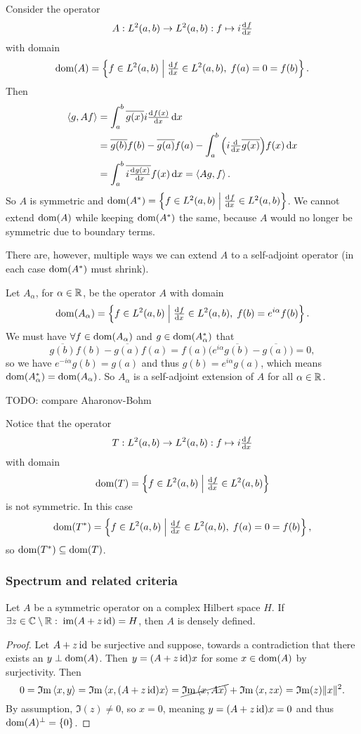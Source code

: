 \begin{example}
Consider the operator
\[ A: L^2(a,b) \to L^2(a,b): f\mapsto i\od{f}{x} \]
with domain
\[ \dom(A) = \setbuilder{f\in L^2(a,b)}{\od{f}{x}\in L^2(a,b),\; f(a) = 0 = f(b)}. \]
Then
\begin{align*}
\inner{g, Af} &= \int_{a}^b \overline{g(x)}i\od{f(x)}{x}\diff{x} \\
&= \overline{g(b)}f(b) - \overline{g(a)}f(a) - \int_{a}^b \Big(i \od{}{x}\overline{g(x)}\Big)f(x)\diff{x} \\
&= \int_a^b \overline{i \od{g(x)}{x}} f(x) \diff{x} = \inner{Ag, f}.
\end{align*}
So $A$ is symmetric and $\dom(A^*) = \setbuilder{f\in L^2(a,b)}{\od{f}{x}\in L^2(a,b)}$. We cannot extend $\operatorname{dom}(A)$ while keeping $\operatorname{dom}(A^*)$ the same, because $A$ would no longer be symmetric due to boundary terms.

There are, however, multiple ways we can extend $A$ to a self-adjoint operator (in each case $\operatorname{dom}(A^*)$ must shrink).

Let $A_\alpha$, for $\alpha\in \mathbb{R}$, be the operator $A$ with domain
\[ \dom(A_\alpha) = \setbuilder{f\in L^2(a,b)}{\od{f}{x}\in L^2(a,b),\; f(b) = e^{i\alpha}f(b)}. \]
We must have $\forall f\in \operatorname{dom}(A_\alpha)$ and $g\in\operatorname{dom}(A^*_\alpha)$ that
\[ \overline{g(b)}f(b) - \overline{g(a)}f(a) = f(a)\Big(e^{i\alpha}\overline{g(b)} - \overline{g(a)}\Big) = 0, \]
so we have $e^{-i\alpha}g(b) = g(a)$ and thus $g(b) = e^{i\alpha}g(a)$, which means $\operatorname{dom}(A_\alpha^*) = \operatorname{dom}(A_\alpha)$. So $A_\alpha$ is a self-adjoint extension of $A$ for all $\alpha\in \mathbb{R}$.

TODO: compare Aharonov-Bohm
\end{example}
Notice that the operator
\[ T: L^2(a,b) \to L^2(a,b): f\mapsto i\od{f}{x} \]
with domain
\[ \dom(T) = \setbuilder{f\in L^2(a,b)}{\od{f}{x}\in L^2(a,b)} \]
is not symmetric. In this case
\[  \dom(T^*) = \setbuilder{f\in L^2(a,b)}{\od{f}{x}\in L^2(a,b),\; f(a)=0=f(b)}, \]
so $\operatorname{dom}(T^*) \subseteq \operatorname{dom}(T)$.

\subsubsection{Spectrum and related criteria}

\begin{lemma}
Let $A$ be a symmetric operator on a complex Hilbert space $H$. If $\exists z \in \mathbb{C}\setminus\mathbb{R}: \; \operatorname{im}(A+z\operatorname{id}) = H$, then $A$ is densely defined.
\end{lemma}
\begin{proof}
Let $A+z\operatorname{id}$ be surjective and suppose, towards a contradiction that there exists an $y\perp \operatorname{dom}(A)$. Then $y = (A+z\operatorname{id})x$ for some $x\in\operatorname{dom}(A)$ by surjectivity. Then
\[ 0 = \operatorname{\mathfrak{I}m}\left\langle x,y \right\rangle = \operatorname{\mathfrak{I}m}\left\langle x, (A+z\operatorname{id})x \right\rangle = \cancel{\operatorname{\mathfrak{I}m}\left\langle x,Ax \right\rangle} + \operatorname{\mathfrak{I}m} \left\langle x,zx \right\rangle = \operatorname{\mathfrak{I}m}(z)\lVert x\rVert^2. \]
By assumption, $\Im(z) \neq 0$, so $x=0$, meaning $y = (A+z\operatorname{id})x = 0$ and thus $\operatorname{dom}(A)^\perp = \{0\}$.
\end{proof}

